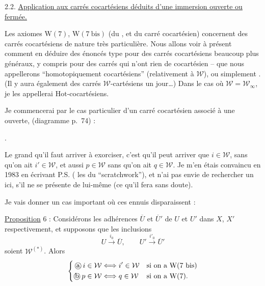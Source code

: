 2.2. \uline{Application aux carrés cocartésiens déduits
d'une immersion ouverte ou fermée.}

Les axiomes $\mathrm W(7)$, $\mathrm W(7\ \mathrm{bis})$ (du ,  et du
carré cocartésien) concernent des carrés cocartésiens
de nature très particulière. Nous allons
voir à présent comment en déduire des
énoncés   type pour des carrés cocartésiens
beaucoup plus généraux, y compris pour des
carrés qui n'ont rien de cocartésien  --
  que nous appellerons ``homotopiquement
cocartésiens'' (relativement à $\mathcal W$), ou simplement
. (Il y aura également des carrés
$\mathcal W$-cartésiens un jour\ldots) Dans le cas où
$\mathcal W=\mathcal W_\infty$, je les appellerai  $\mathrm{Hot}$-cocartésiens.

Je commencerai par le cas particulier
d'un carré cocartésien associé à une 
ouverte, (diagramme  p.~74) :

.


Le grand   qu'il faut arriver à exorciser,
c'est qu'il peut arriver que $i\in\mathcal W$, sans qu'on
ait $i'\in\mathcal W$, et aussi $p\in\mathcal W$ sans qu'on ait $q\in\mathcal W$.
Je m'en étais convaincu en 1983 en écrivant
P.S. ( les  du ``scratchwork''),
et n'ai pas envie de rechercher un 
ici, s'il ne se présente de lui-même (ce
qu'il fera sans doute).

Je vais donner un cas important où ces
ennuis disparaissent :

\uline{Proposition} 6 : Considérons les adhérences $\overline U$
et $\overline U'$ de $U$ et $U'$ dans $X$, $X'$ respectivement,
et supposons que  les inclusions
\[
 U\xrightarrow{i_0}\overline U,\qquad U'\xrightarrow{i'_0}\overline U'
\]
soient  $\mathcal W^{(*)}$. Alors
\[
\left\{\begin{aligned}
\text{\textcircled{a}}\, i\in\mathcal W&\Longleftrightarrow i'\in\mathcal W &&\text{si on a }\mathrm W(7\ \mathrm{bis})\\
\text{\textcircled{b}}\, p\in\mathcal W&\Longleftrightarrow q\in\mathcal W &&\text{si on a }\mathrm W(7).
\end{aligned}\right.
\]

